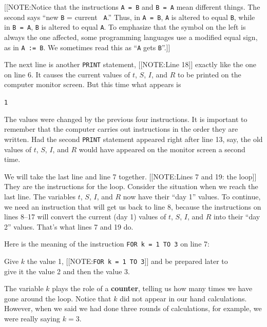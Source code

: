 [[NOTE:Notice that the instructions {\tt A = B} and {\tt B = A} mean
  different things.  The second says ``new {\tt B} = current {\tt
    A}.''  Thus, in {\tt A = B}, {\tt A} is altered to equal {\tt B},
  while in {\tt B = A}, {\tt B} is altered to equal {\tt A}.  To
  emphasize that the symbol on the left is always the one affected,
  some programming languages use a modified equal sign, as in {\tt A
    := B}.  We sometimes read this as ``{\tt A} gets {\tt B}''.]]



The next line is another {\tt PRINT} statement, 
[[NOTE:Line 18]]
exactly like the one on line 6.  It causes the current values of $t$,
$S$, $I$, and $R$ to be printed on the computer monitor screen.  But
this time what appears is
\begin{center}
{\tt 1}   
\end{center}
The values were changed by the previous four instructions.  It is
important to remember that the computer carries out instructions in
the order they are written.  Had the second {\tt PRINT} statement
appeared right after line 13, say, the old values of $t$, $S$, $I$,
and $R$ would have appeared on the monitor screen a second time.

We will take the last line and line 7 together.  
[[NOTE:Lines 7 and 19:  the loop]]
They are the instructions for the loop.  Consider the situation when
we reach the last line.  The variables $t$, $S$, $I$, and $R$ now have
their ``day 1'' values.  To continue, we need an instruction that will
get us back to line 8, because the instructions on lines 8--17 will
convert the current (day 1) values of $t$, $S$, $I$, and $R$ into
their ``day 2'' values.  That's what lines 7 and 19 do.

Here is the meaning of the instruction {\tt FOR k = 1 TO 3} on line 7:
\begin{center}
	Give $k$ the value 1, 
	[[NOTE:\mbox{\tt FOR k = 1 TO 3}]]
		and be prepared later to  \\
	give it the value 2 and then the value 3.
\end{center}
The variable $k$ plays the role of a {\bf counter},
telling us how many times we have gone around the loop.  Notice that
$k$ did not appear in our hand calculations.  However, when we said we
had done three rounds of calculations, for example, we were really
saying $k = 3$.


